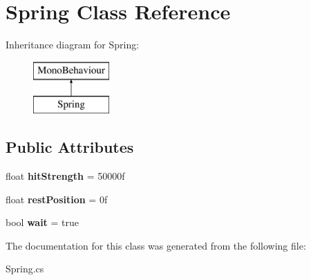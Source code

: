 \hypertarget{class_spring}{}\section{Spring Class Reference}
\label{class_spring}
Inheritance diagram for Spring\+:\begin{figure}[H]
\begin{center}
\leavevmode
\includegraphics[height=2.000000cm]{class_spring}
\end{center}
\end{figure}
\subsection*{Public Attributes}
\begin{DoxyCompactItemize}
\item 
\mbox{\label{class_spring_acaad70263479287c00291512b37f7a65}} 
float {\bfseries hit\+Strength} = 50000f
\item 
\mbox{\label{class_spring_aa3c6f1b7a112aece7583223d7558be52}} 
float {\bfseries rest\+Position} = 0f
\item 
\mbox{\label{class_spring_a7efc825f56da642ad8fa58c7fd46ed13}} 
bool {\bfseries wait} = true
\end{DoxyCompactItemize}


The documentation for this class was generated from the following file\+:\begin{DoxyCompactItemize}
\item 
Spring.\+cs\end{DoxyCompactItemize}
